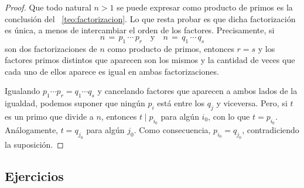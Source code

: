 \begin{proof}
	Que todo natural $n>1$ se puede expresar como producto de primos es
	la conclusi\'on del \teoname~\ref{teo:factorizacion}. Lo que resta
	probar es que dicha factorizaci\'on es \'unica, a menos de
	intercambiar el orden de los factores. Precisamente, si
	\begin{displaymath}
		n\,=\,p_1\,\cdots\,p_r
		\quad\text{y}\quad n\,=\,q_1\,\cdots\,q_s
	\end{displaymath}
	son dos factorizaciones de $n$ como producto de primos,
	entonces $r=s$ y
	los factores primos distintos que aparecen son los mismos y la
	cantidad de veces que cada uno de ellos aparece es igual en ambas
	factorizaciones.

	Igualando $p_1\cdots p_r=q_1\cdots q_s$ y cancelando factores que
	aparecen a ambos lados de la igualdad, podemos suponer que ning\'un
	$p_i$ est\'a entre los $q_j$ y viceversa.
	Pero, si $t$ es un primo que divide a $n$, entonces $t\mid p_{i_0}$
	para alg\'un $i_0$, con lo que $t=p_{i_0}$. An\'alogamente,
	$t=q_{j_0}$ para alg\'un $j_0$. Como consecuencia, $p_{i_0}=q_{j_0}$,
	contradiciendo la suposici\'on.
\end{proof}

\subsection*{Ejercicios}


